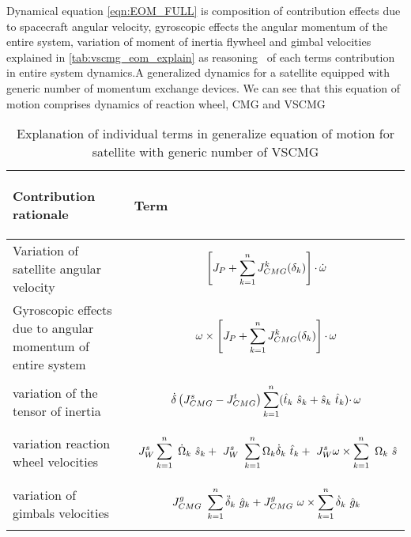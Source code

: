 Dynamical equation \autoref{eqn:EOM_FULL} is composition of contribution effects due to spacecraft angular velocity, gyroscopic effects the angular momentum of the entire system, variation of moment of inertia flywheel and gimbal velocities explained in \autoref{tab:vscmg_eom_explain} as reasoning \ of each terms contribution in entire system dynamics.A generalized dynamics for a satellite equipped with generic number of momentum exchange devices. We can see that this equation of motion comprises dynamics of reaction wheel, CMG and VSCMG 
\begin{table}[!ht]
\centering
\begin{tabular}{p{}||p{}}
\toprule
\begin{center} Contribution rationale  \end{center}& \begin{center}
     Term
 \end{center} \\
\midrule
Variation of satellite angular velocity & 
\begin{equation*}
\left[ J_{P} +\sum ^{n}_{k=1} J^{k}_{CMG}( \delta_{k})\right] \cdotp \dot{\omega }
\vspace{-1em}\end{equation*} \\
\hline 
 Gyroscopic effects due to angular momentum of entire system & 
\begin{equation*}
\omega \times \left[ J_{P} +\sum ^{n}_{k=1} J^{k}_{CMG}( \delta_{k})\right] \cdotp \omega 
\vspace{-1em}\end{equation*} \\
\hline 
 variation of the tensor of inertia & 
\begin{equation*}
\dot{\delta}\left( J^{s}_{CMG} -J^{t}_{CMG}\right)\sum ^{n}_{k=1}(\hat{t}_{k} \ \hat{s}_{k} +\hat{s}_{k} \ \hat{t}_{k}) \cdotp \omega 
\vspace{-1em}\end{equation*} \\
\hline 
variation reaction wheel velocities & 
\begin{equation*}
\ J^{s}_{W}\sum ^{n}_{k=1} \ \dot{\Omega }_{k} \ \hat{s}_{k} +\ J^{s}_{W} \ \sum ^{n}_{k=1} \Omega _{k}\dot{\delta}_{k} \ \hat{t}_{k} +\ J^{s}_{W} \omega \times \sum ^{n}_{k=1} \ \Omega _{k} \ \hat{s}
\vspace{-1em}\end{equation*} \\
\hline 
 variation of gimbals velocities & 
\begin{equation*}
J^{g}_{CMG} \ \sum ^{n}_{k=1}\ddot{\delta}_{k} \ \hat{g}_{k} +J^{g}_{CMG} \ \omega \times \sum ^{n}_{k=1}\dot{\delta}_{k} \ \hat{g}_{k}
\vspace{-1em}\end{equation*} \\
\bottomrule
\end{tabular}
    \caption{Explanation of individual terms in generalize equation of motion for satellite with generic number of VSCMG}
    \label{tab:vscmg_eom_explain}
\end{table}

